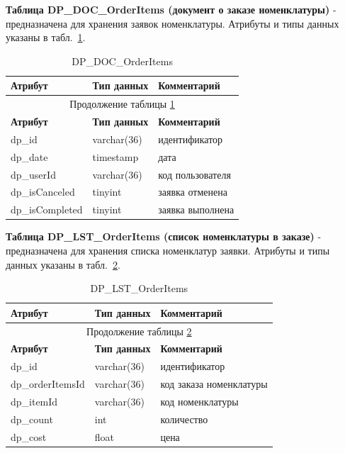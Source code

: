 \textbf{Таблица DP\_DOC\_OrderItems (документ о заказе номенклатуры)} - предназначена для хранения заявок номенклатуры.
Атрибуты и типы данных указаны в табл.~\ref{tab:DP_DOC_OrderItems}.

\begin{longtable}{|p{5.5cm}|p{3.5cm}|p{7.5cm}|}
    \caption{DP\_DOC\_OrderItems} \label{tab:DP_DOC_OrderItems} \\
    \hline
    \textbf{Атрибут} & \textbf{Тип данных} & \textbf{Комментарий} \\ \hline
    \endfirsthead

    \multicolumn{3}{c}{Продолжение таблицы \ref{tab:DP_DOC_OrderItems}} \\
    \hline
    \textbf{Атрибут} & \textbf{Тип данных} & \textbf{Комментарий} \\ \hline
    \endhead

    \endfoot

    \endlastfoot
    dp\_id & varchar(36) & идентификатор \\ \hline
    dp\_date & timestamp & дата \\ \hline
    dp\_userId & varchar(36) & код пользователя \\ \hline
    dp\_isCanceled & tinyint & заявка отменена \\ \hline
    dp\_isCompleted & tinyint & заявка выполнена \\ \hline
\end{longtable}

\textbf{Таблица DP\_LST\_OrderItems (список номенклатуры в заказе)} - предназначена для хранения списка номенклатур заявки.
Атрибуты и типы данных указаны в табл.~\ref{tab:DP_LST_OrderItems}.

\begin{longtable}{|p{5.5cm}|p{3.5cm}|p{7.5cm}|}
    \caption{DP\_LST\_OrderItems} \label{tab:DP_LST_OrderItems} \\
    \hline
    \textbf{Атрибут} & \textbf{Тип данных} & \textbf{Комментарий} \\ \hline
    \endfirsthead

    \multicolumn{3}{c}{Продолжение таблицы \ref{tab:DP_LST_OrderItems}} \\
    \hline
    \textbf{Атрибут} & \textbf{Тип данных} & \textbf{Комментарий} \\ \hline
    \endhead

    \endfoot

    \endlastfoot
    dp\_id & varchar(36) & идентификатор \\ \hline
    dp\_orderItemsId & varchar(36) & код заказа номенклатуры \\ \hline
    dp\_itemId & varchar(36) & код номенклатуры \\ \hline
    dp\_count & int & количество \\ \hline
    dp\_cost & float & цена \\ \hline
\end{longtable}

